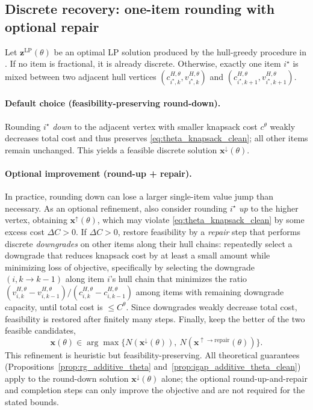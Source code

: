 \documentclass[11pt, a4paper]{article}
\theoremstyle{plain}
\theoremstyle{definition}
\theoremstyle{remark}
\begin{document}
\subsection{Discrete recovery: one-item rounding with optional repair}\label{subsec:rounding}

Let $\bm z^{\mathrm{LP}}(\theta)$ be an optimal LP solution produced by the hull-greedy procedure in .
If no item is fractional, it is already discrete. Otherwise, exactly one item $i^\star$ is mixed between two adjacent hull vertices
$(c^{H,\theta}_{i^\star,k},v^{H,\theta}_{i^\star,k})$ and $(c^{H,\theta}_{i^\star,k+1},v^{H,\theta}_{i^\star,k+1})$.

\paragraph{Default choice (feasibility-preserving round-down).}
Rounding $i^\star$ \emph{down} to the adjacent vertex with smaller knapsack cost $c^\theta$ weakly decreases total cost and thus preserves
\eqref{eq:theta_knapsack_clean}; all other items remain unchanged. This yields a feasible discrete solution $\bm x^{\downarrow}(\theta)$.

\paragraph{Optional improvement (round-up + repair).}
In practice, rounding down can lose a larger single-item value jump than necessary. As an optional refinement, also consider rounding
$i^\star$ \emph{up} to the higher vertex, obtaining $\bm x^{\uparrow}(\theta)$, which may violate \eqref{eq:theta_knapsack_clean} by some
excess cost $\Delta C>0$. If $\Delta C>0$, restore feasibility by a \emph{repair} step that performs discrete \emph{downgrades} on other
items along their hull chains: repeatedly select a downgrade that reduces knapsack cost by at least a small amount while minimizing loss of
objective, specifically by selecting the downgrade $(i, k \to k{-}1)$ along item $i$'s hull chain that minimizes the ratio
$(v^{H,\theta}_{i,k}-v^{H,\theta}_{i,k-1})/(c^{H,\theta}_{i,k}-c^{H,\theta}_{i,k-1})$ among items with remaining downgrade capacity, until total cost is $\le C^\theta$. Since downgrades weakly decrease total cost, feasibility
is restored after finitely many steps. Finally, keep the better of the two feasible candidates,
\[
\bm x(\theta)\in\arg\max\{N(\bm x^{\downarrow}(\theta)),\ N(\bm x^{\uparrow\!\to\!\mathrm{repair}}(\theta))\}.
\]
This refinement is heuristic but feasibility-preserving. All theoretical guarantees (Propositions~\ref{prop:rg_additive_theta} and~\ref{prop:igap_additive_theta_clean}) apply to the round-down solution $\bm x^{\downarrow}(\theta)$ alone; the optional round-up-and-repair and completion steps can only improve the objective and are not required for the stated bounds.
\end{document}
